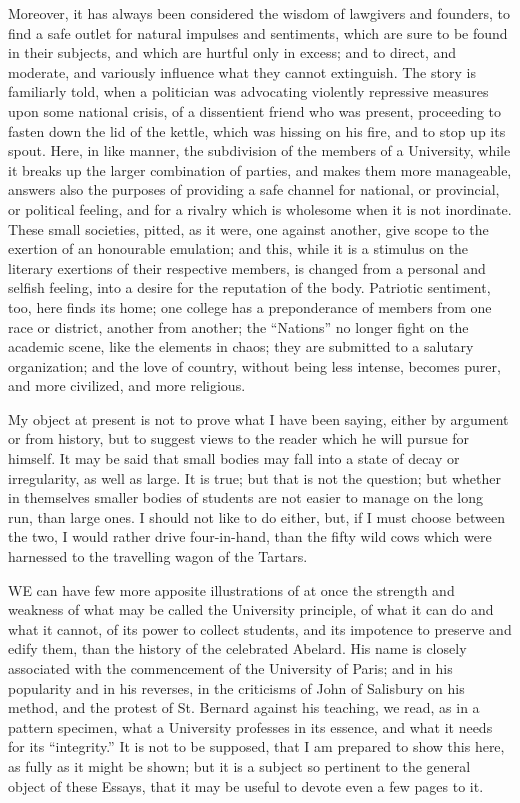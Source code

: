 Moreover, it has always been
considered the wisdom of lawgivers and founders, to find a safe outlet
for natural impulses and sentiments, which are sure to be found in
their subjects, and which are hurtful only in excess; and to direct,
and moderate, and variously influence what they cannot extinguish. The
story is familiarly told, when a politician was advocating violently
repressive measures upon some national crisis, of a dissentient friend
who was present, proceeding to fasten down the lid of the kettle,
which was hissing on his fire, and to stop up its spout. Here, in like
manner, the subdivision of the members of a University, while it
breaks up the larger combination of parties, and makes them more
manageable, answers also the purposes of providing a safe channel for
national, or provincial, or political feeling, and for a rivalry which
is wholesome when it is not inordinate. These small societies, pitted,
as it were, one against another, give scope to the exertion of an
honourable emulation; and this, while it is a stimulus on the literary
exertions of their respective members, is changed from a personal and
selfish feeling, into a desire for the reputation of the body. Patriotic sentiment, too, here finds its home; one college has a
preponderance of members from one race or district, another from
another; the ``Nations'' no longer fight on the academic scene, like
the elements in chaos; they are submitted to a salutary organization;
and the love of country, without being less intense, becomes purer,
and more civilized, and more religious.

My object at present is not to
prove what I have been saying, either by argument or from history, but
to suggest views to the reader which he will pursue for himself. It
may be said that small bodies may fall into a state of decay or
irregularity, as well as large. It is true; but that is not the
question; but whether in themselves smaller bodies of students are not
easier to manage on the long run, than large ones. I should not like
to do either, but, if I must choose between the two, I would rather
drive four-in-hand, than the fifty wild cows which were harnessed to
the travelling wagon of the Tartars.


WE
can have few more apposite illustrations of at once the strength and
weakness of what may be called the University principle, of what it
can do and what it cannot, of its power to collect students, and its
impotence to preserve and edify them, than the history of the
celebrated Abelard. His name is closely associated with the
commencement of the University of Paris; and in his popularity and in
his reverses, in the criticisms of John of Salisbury on his method,
and the protest of St. Bernard against his teaching, we read, as in a
pattern specimen, what a University professes in its essence, and what
it needs for its ``integrity.'' It is not to be supposed, that I am
prepared to show this here, as fully as it might be shown; but it is a
subject so pertinent to the general object of these Essays, that it
may be useful to devote even a few pages to it.

